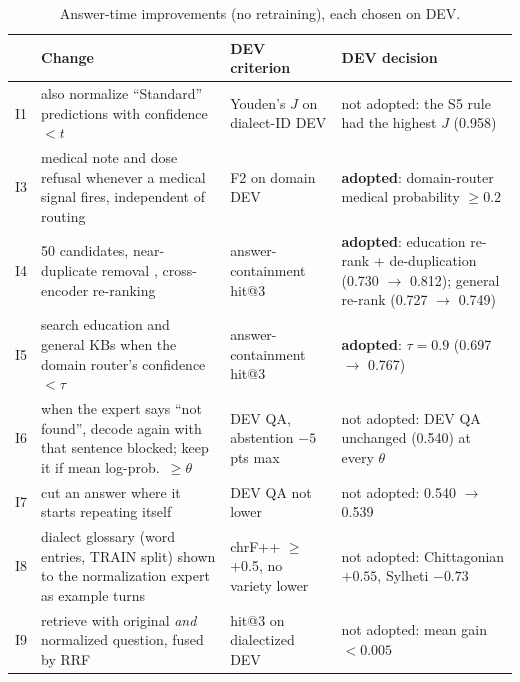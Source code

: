 \begin{table}[!t]
\centering
\caption{Answer-time improvements (no retraining), each chosen on DEV.}
\label{tab:v2}
\scriptsize
\begin{tabularx}{\linewidth}{@{}l Y L{2.0cm} L{3.1cm}@{}}
\toprule
& Change & DEV criterion & DEV decision \\
\midrule
I1 & also normalize ``Standard'' predictions with confidence $<t$ & Youden's $J$ \cite{youden1950index} on dialect-ID DEV & not adopted: the S5 rule had the highest $J$ (0.958) \\
I3 & medical note and dose refusal whenever a medical signal fires, independent of routing & F2 on domain DEV & \textbf{adopted}: domain-router medical probability $\ge 0.2$ \\
I4 & 50 candidates, near-duplicate removal \cite{lee2022dedup}, cross-encoder re-ranking \cite{nogueira2019passage,bgereranker2024} & answer-containment hit@3 & \textbf{adopted}: education re-rank + de-duplication (0.730 $\rightarrow$ 0.812); general re-rank (0.727 $\rightarrow$ 0.749) \\
I5 & search education and general KBs when the domain router's confidence $<\tau$ \cite{lee2025routerretriever} & answer-containment hit@3 & \textbf{adopted}: $\tau=0.9$ (0.697 $\rightarrow$ 0.767) \\
I6 & when the expert says ``not found'', decode again with that sentence blocked; keep it if mean log-prob.\ $\ge\theta$ & DEV QA, abstention $-5$ pts max & not adopted: DEV QA unchanged (0.540) at every $\theta$ \\
I7 & cut an answer where it starts repeating itself \cite{xu2022ditto} & DEV QA not lower & not adopted: 0.540 $\rightarrow$ 0.539 \\
I8 & dialect glossary (word entries, TRAIN split) shown to the normalization expert as example turns & chrF++ $\ge$ +0.5, no variety lower & not adopted: Chittagonian $+0.55$, Sylheti $-0.73$ \\
I9 & retrieve with original \emph{and} normalized question, fused by RRF \cite{rackauckas2024ragfusion} & hit@3 on dialectized DEV & not adopted: mean gain $<0.005$ \\
\bottomrule
\end{tabularx}
\end{table}

